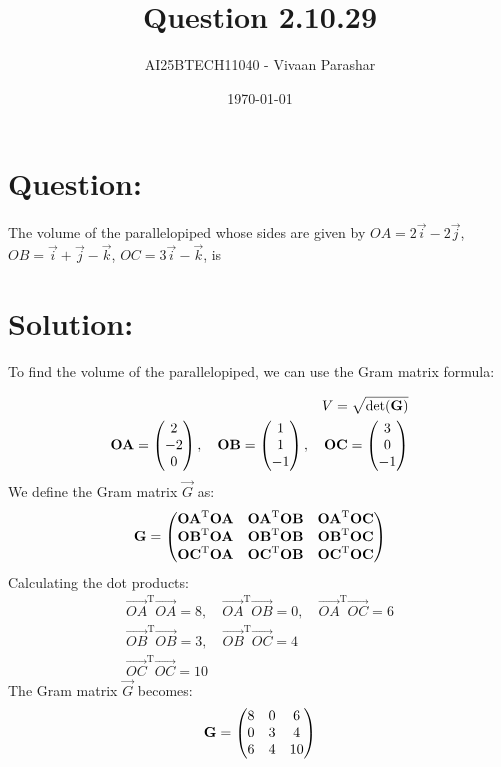 \documentclass[a4paper, 12pt]{article}
\title{Question 2.10.29}
\author{AI25BTECH11040 - Vivaan Parashar}
\date{\today}
\begin{document}
\maketitle

\section{Question: }
The volume of the parallelopiped whose sides are given by $\textit{OA} = 2\vec{i}-2\vec{j}$, $\textit{OB} = \vec{i}+\vec{j}-\vec{k}$, $\textit{OC} = 3\vec{i} - \vec{k}$, is

\section{Solution: }
To find the volume of the parallelopiped, we can use the Gram matrix formula:

\begin{align}
    V = \sqrt{\det(\mathbf{G})} \\
    \mathbf{OA} = \begin{pmatrix}2      \\ -2 \\ 0\end{pmatrix}, \quad
    \mathbf{OB} = \begin{pmatrix}1      \\ 1 \\ -1\end{pmatrix}, \quad
    \mathbf{OC} = \begin{pmatrix}3      \\ 0 \\ -1\end{pmatrix}\\
\end{align}
We define the Gram matrix $\vec{G}$ as:
\begin{align}
    \mathbf{G} = \begin{pmatrix}\mathbf{OA}^{\mathrm{T}}\mathbf{OA} & \mathbf{OA}^{\mathrm{T}}\mathbf{OB} & \mathbf{OA}^{\mathrm{T}}\mathbf{OC}  \\
    \mathbf{OB}^{\mathrm{T}}\mathbf{OA}                  & \mathbf{OB}^{\mathrm{T}}\mathbf{OB} & \mathbf{OB}^{\mathrm{T}}\mathbf{OC}  \\
    \mathbf{OC}^{\mathrm{T}}\mathbf{OA}                  & \mathbf{OC}^{\mathrm{T}}\mathbf{OB} & \mathbf{OC}^{\mathrm{T}}\mathbf{OC}\end{pmatrix}
\end{align}
Calculating the dot products:
\begin{align}
    \vec{OA}^{\mathrm{T}}\vec{OA} = 8, \quad
    \vec{OA}^{\mathrm{T}}\vec{OB} = 0, \quad
    \vec{OA}^{\mathrm{T}}\vec{OC} = 6 \\
    \vec{OB}^{\mathrm{T}}\vec{OB} = 3, \quad
    \vec{OB}^{\mathrm{T}}\vec{OC} = 4 \\
    \vec{OC}^{\mathrm{T}}\vec{OC} = 10
\end{align}
The Gram matrix $\vec{G}$ becomes:
\begin{align}
    \mathbf{G} = \begin{pmatrix}
    8 & 0 & 6  \\
    0 & 3 & 4  \\
    6 & 4 & 10
    \end{pmatrix}
\end{align}
\end{document}
